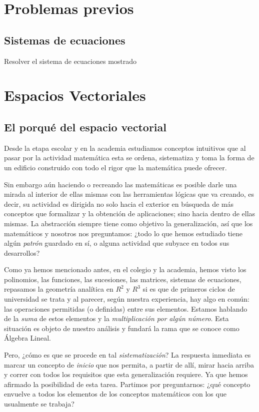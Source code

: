 \documentclass[b5paper, 11pt]{book}
\newcommand{\0}{\mathbf{0}}
\theoremstyle{estiloB}
\theoremstyle{estiloC}
\theoremstyle{estiloD}
\begin{document}
\setcounter{chapter}{-1} 
\chapter{Problemas previos}
\section{Sistemas de ecuaciones}
Resolver el sistema de ecuaciones mostrado
\chapter{Espacios Vectoriales}

\section{El porqué del espacio vectorial}
Desde la etapa escolar y en la academia estudiamos conceptos intuitivos que al pasar por la actividad matemática esta se ordena, sistematiza y toma la forma de un edificio construido con todo el rigor que la matemática puede ofrecer.

Sin embargo aún haciendo o recreando las matemáticas es posible darle una mirada al interior de ellas mismas con las herramientas lógicas que va creando, es decir, su actividad es dirigida no solo hacia el exterior en búsqueda de más conceptos que formalizar y la obtención de aplicaciones; sino hacia dentro de ellas mismas. La abstracción siempre tiene como objetivo la generalización, así que los matemáticos y nosotros nos preguntamos: ¿todo lo que hemos estudiado tiene algún \textit{patrón} guardado en sí, o alguna actividad que subyace en todos sus desarrollos?

Como ya hemos mencionado antes, en el colegio y la academia, hemos visto los polinomios, las funciones, las sucesiones, las matrices, sistemas de ecuaciones, repasamos la geometría analítica en $R^{2}$ y $R^{3}$ si es que de primeros ciclos de universidad se trata y al parecer, según nuestra experiencia, hay algo en común: las operaciones permitidas (o definidas) entre sus elementos. Estamos hablando de la \textit{suma} de estos elementos y la \textit{multiplicación por algún número}. Esta situación es objeto de nuestro análisis y fundará la rama que se conoce como Álgebra Lineal.

Pero, ¿cómo es que se procede en tal \textit{sistematización}? La respuesta inmediata es marcar un concepto de \textit{inicio} que nos permita, a partir de allí, mirar hacia arriba y correr con todos los requisitos que esta generalización requiere. Ya que hemos afirmado la posibilidad de esta tarea. Partimos por preguntarnos: ¿qué concepto envuelve a todos los elementos de los conceptos matemáticos con los que usualmente se trabaja? 
\end{document}
